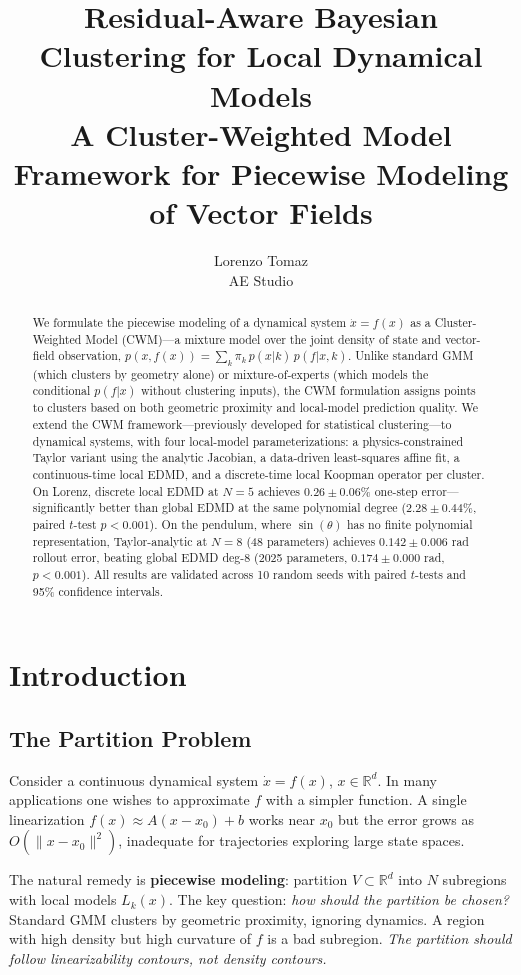 \documentclass[11pt]{article}
\title{Residual-Aware Bayesian Clustering for Local Dynamical Models\\[0.3em]\large A Cluster-Weighted Model Framework for Piecewise Modeling of Vector Fields}
\author{Lorenzo Tomaz\\AE Studio}
\date{}
\theoremstyle{definition}
\newcommand{\R}{\mathbb{R}}
\begin{document}
\maketitle

\begin{abstract}
We formulate the piecewise modeling of a dynamical system $\dot{x}=f(x)$ as a Cluster-Weighted Model (CWM)---a mixture model over the joint density of state and vector-field observation, $p(x,f(x))=\sum_k\pi_k\,p(x|k)\,p(f|x,k)$. Unlike standard GMM (which clusters by geometry alone) or mixture-of-experts (which models the conditional $p(f|x)$ without clustering inputs), the CWM formulation assigns points to clusters based on both geometric proximity and local-model prediction quality. We extend the CWM framework---previously developed for statistical clustering---to dynamical systems, with four local-model parameterizations: a physics-constrained Taylor variant using the analytic Jacobian, a data-driven least-squares affine fit, a continuous-time local EDMD, and a discrete-time local Koopman operator per cluster. On Lorenz, discrete local EDMD at $N=5$ achieves $0.26\pm0.06\%$ one-step error---significantly better than global EDMD at the same polynomial degree ($2.28\pm0.44\%$, paired $t$-test $p<0.001$). On the pendulum, where $\sin(\theta)$ has no finite polynomial representation, Taylor-analytic at $N=8$ (48 parameters) achieves $0.142\pm0.006$ rad rollout error, beating global EDMD deg-8 (2025 parameters, $0.174\pm0.000$ rad, $p<0.001$). All results are validated across 10 random seeds with paired $t$-tests and 95\% confidence intervals.
\end{abstract}

\section{Introduction}

\subsection{The Partition Problem}

Consider a continuous dynamical system $\dot{x}=f(x)$, $x\in\R^d$. In many applications one wishes to approximate $f$ with a simpler function. A single linearization $f(x)\approx A(x-x_0)+b$ works near $x_0$ but the error grows as $O(\|x-x_0\|^2)$, inadequate for trajectories exploring large state spaces.

The natural remedy is \textbf{piecewise modeling}: partition $V\subset\R^d$ into $N$ subregions with local models $L_k(x)$. The key question: \emph{how should the partition be chosen?} Standard GMM clusters by geometric proximity, ignoring dynamics. A region with high density but high curvature of $f$ is a bad subregion. \emph{The partition should follow linearizability contours, not density contours.}
\end{document}
